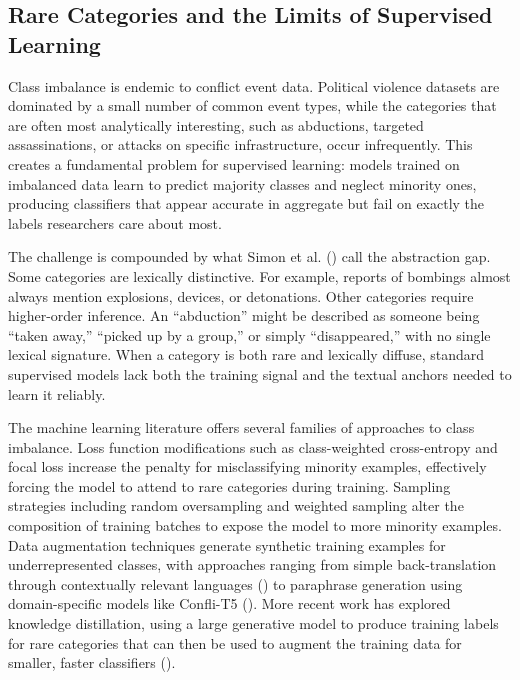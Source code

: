 \documentclass[
  11pt,
]{article}
\begin{document}
\subsection{Rare Categories and the Limits of Supervised
Learning}\label{rare-categories-and-the-limits-of-supervised-learning}

Class imbalance is endemic to conflict event data. Political violence
datasets are dominated by a small number of common event types, while
the categories that are often most analytically interesting, such as
abductions, targeted assassinations, or attacks on specific
infrastructure, occur infrequently. This creates a fundamental problem
for supervised learning: models trained on imbalanced data learn to
predict majority classes and neglect minority ones, producing
classifiers that appear accurate in aggregate but fail on exactly the
labels researchers care about most.

The challenge is compounded by what Simon et al.
() call the abstraction gap. Some
categories are lexically distinctive. For example, reports of bombings
almost always mention explosions, devices, or detonations. Other
categories require higher-order inference. An ``abduction'' might be
described as someone being ``taken away,'' ``picked up by a group,'' or
simply ``disappeared,'' with no single lexical signature. When a
category is both rare and lexically diffuse, standard supervised models
lack both the training signal and the textual anchors needed to learn it
reliably.

The machine learning literature offers several families of approaches to
class imbalance. Loss function modifications such as class-weighted
cross-entropy and focal loss increase the penalty for misclassifying
minority examples, effectively forcing the model to attend to rare
categories during training. Sampling strategies including random
oversampling and weighted sampling alter the composition of training
batches to expose the model to more minority examples. Data augmentation
techniques generate synthetic training examples for underrepresented
classes, with approaches ranging from simple back-translation through
contextually relevant languages () to paraphrase generation using domain-specific models like
Confli-T5 (). More
recent work has explored knowledge distillation, using a large
generative model to produce training labels for rare categories that can
then be used to augment the training data for smaller, faster
classifiers ().
\end{document}
